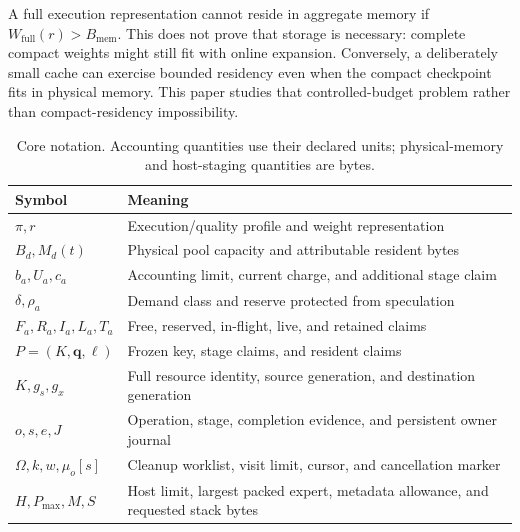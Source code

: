 A full execution representation cannot reside in aggregate memory if
$W_{\mathrm{full}}(r)>B_{\mathrm{mem}}$. This does not prove that storage is
necessary: complete compact weights might still fit with online expansion.
Conversely, a deliberately small cache can exercise bounded residency even
when the compact checkpoint fits in physical memory. This paper studies that
controlled-budget problem rather than compact-residency impossibility.

\begin{table}[!htbp]
\centering
\small
\begin{tabularx}{\linewidth}{@{}l>{\raggedright\arraybackslash}X@{}}
\toprule
Symbol & Meaning \\
\midrule
$\pi,r$ & Execution/quality profile and weight representation \\
$B_d,M_d(t)$ & Physical pool capacity and attributable resident bytes \\
$b_a,U_a,c_a$ & Accounting limit, current charge, and additional stage claim \\
$\delta,\rho_a$ & Demand class and reserve protected from speculation \\
$F_a,R_a,I_a,L_a,T_a$ & Free, reserved, in-flight, live, and retained claims \\
$P=(K,\boldsymbol q,\boldsymbol\ell)$ & Frozen key, stage claims, and resident claims \\
$K,g_s,g_x$ & Full resource identity, source generation, and destination generation \\
$o,s,e,J$ & Operation, stage, completion evidence, and persistent owner journal \\
$\Omega,k,w,\mu_o[s]$ & Cleanup worklist, visit limit, cursor, and cancellation marker \\
$H,P_{\max},M,S$ & Host limit, largest packed expert, metadata allowance, and requested stack bytes \\
\bottomrule
\end{tabularx}
\caption{Core notation. Accounting quantities use their declared units;
physical-memory and host-staging quantities are bytes.}
\label{tab:symbols}
\end{table}

